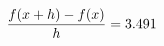 \documentclass[preview]{standalone}
\begin{document}
\begin{align*}
\special{dvisvgm:raw <g id='unique000'>}\frac{f(x+h)-f(x)}{h} = 3.491\special{dvisvgm:raw </g>}
\end{align*}
\end{document}
